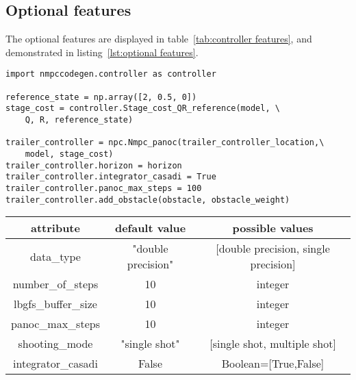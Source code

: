 \subsection{Optional features}
The optional features are displayed in table~\ref{tab:controller features}, and demonstrated in listing~\ref{lst:optional features}.

\begin{lstlisting}[caption={Optional features},captionpos=b,label={lst:optional features}]
import nmpccodegen.controller as controller

reference_state = np.array([2, 0.5, 0])
stage_cost = controller.Stage_cost_QR_reference(model, \
	Q, R, reference_state)

trailer_controller = npc.Nmpc_panoc(trailer_controller_location,\
	model, stage_cost)
trailer_controller.horizon = horizon
trailer_controller.integrator_casadi = True
trailer_controller.panoc_max_steps = 100
trailer_controller.add_obstacle(obstacle, obstacle_weight)
\end{lstlisting}

\begin{center}
	\begin{tabular}{ |c|c|c| } 
		\hline
		attribute & default value & possible values \\ 
		\hline
		data\_type & "double precision" & [double precision, single precision]\\ 
		\hline
		number\_of\_steps & 10 & integer\\ 
		\hline
		lbgfs\_buffer\_size &  10 & integer\\ 
		\hline
		panoc\_max\_steps &  10 & integer\\ 
		\hline
		shooting\_mode & "single shot" & [single shot, multiple shot] \\ 
		\hline
		integrator\_casadi &  False & Boolean=[True,False]\\ 
		\hline
	\end{tabular}
	 \label{tab:controller features} 
\end{center}

